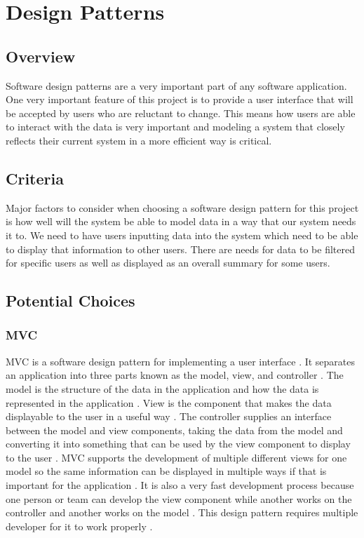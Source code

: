 \documentclass[onecolumn, draftclsnofoot,10pt, compsoc]{IEEEtran}
\begin{document}
\section{Design Patterns}

\subsection{Overview}
Software design patterns are a very important part of any software application. One very important feature of this project is to provide a user interface that will be accepted by users who are reluctant to change. This means how users are able to interact with the data is very important and modeling a system that closely reflects their current system in a more efficient way is critical.

\subsection{Criteria}
Major factors to consider when choosing a software design pattern for this project is how well will the system be able to model data in a way that our system needs it to. We need to have users inputting data into the system which need to be able to display that information to other users. There are needs for data to be filtered for specific users as well as displayed as an overall summary for some users.
\subsection{Potential Choices}

\subsubsection{MVC}
MVC is a software design pattern for implementing a user interface \cite{mvc}. It separates an application into three parts known as the model, view, and controller \cite{mvc}. The model is the structure of the data in the application and how the data is represented in the application \cite{mvc}. View is the component that makes the data displayable to the user in a useful way \cite{mvc}. The controller supplies an interface between the model and view components, taking the data from the model and converting it into something that can be used by the view component to display to the user \cite{mvc}. MVC supports the development of multiple different views for one model so the same information can be displayed in multiple ways if that is important for the application \cite{mvc}. It is also a very fast development process because one person or team can develop the view component while another works on the controller and another works on the model \cite{mvc}. This design pattern requires multiple developer for it to work properly \cite{mvc}.
\end{document}

